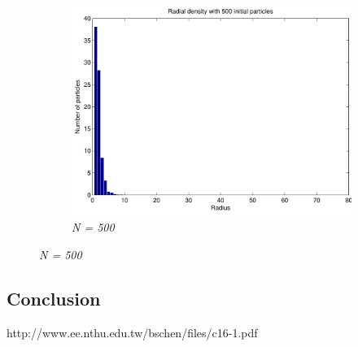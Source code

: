 \documentclass[a4paper,12pt, english]{article}
\begin{document}
\begin{figure}[H]
		\begin{subfigure}[b]{0.6\textwidth}
        \includegraphics[scale=0.5]{radial_density_500.pdf}
        \caption{\textit{N = 500}}
		\end{subfigure}
		
		\label{fig:radial density}        
\end{figure}





\subsection*{Conclusion}
 

http://www.ee.nthu.edu.tw/bschen/files/c16-1.pdf
\end{document}

